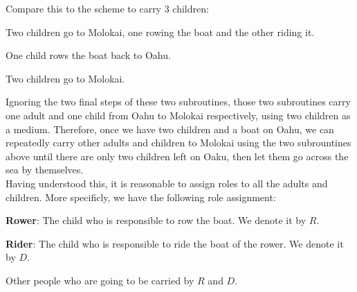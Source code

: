 \documentclass{article}
\begin{document}
\begin{spacing}{1.1}
    Compare this to the scheme to carry 3 children:
    \begin{asparaitem}
    \item Two children go to Molokai, one rowing the boat and the other riding it.\\
    \item One child rows the boat back to Oahu.\\
    \item Two children go to Molokai.\\
    \end{asparaitem}

    Ignoring the two final steps of these two subroutines, those two subroutines carry one adult and one child from Oahu to Molokai respectively, using two children as a medium. Therefore, once we have two children and a boat on Oahu, we can repeatedly carry other adults and children to Molokai using the two subrountines above until there are only two children left on Oaku, then let them go across the sea by themselves.\\

    Having understood this, it is reasonable to assign roles to all the adults and children. More specificly, we have the following role assignment:
    \begin{asparaitem}
    \item \textbf{Rower}: The child who is responsible to row the boat. We denote it by $R$.\\
    \item \textbf{Rider}: The child who is responsible to ride the boat of the rower. We denote it by $D$.\\
    \item Other people who are going to be carried by $R$ and $D$.\\
    \end{asparaitem}


\end{spacing}
\end{document}
